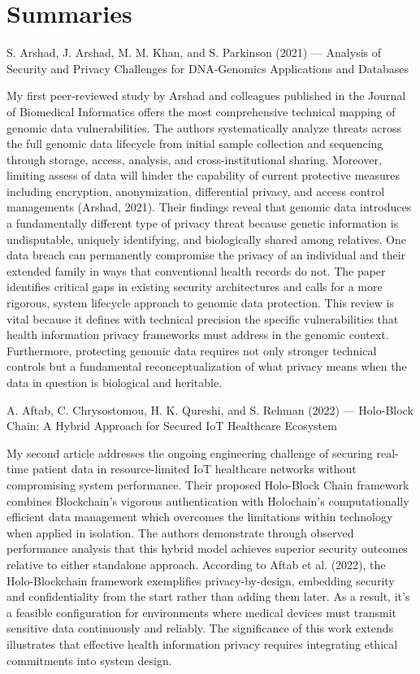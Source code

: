 \documentclass[12pt]{article}
\begin{document}
\section{Summaries}
S. Arshad, J. Arshad, M. M. Khan, and S. Parkinson (2021) — Analysis of Security and Privacy Challenges for DNA-Genomics Applications and Databases

My first peer-reviewed study by Arshad and colleagues published in the Journal of Biomedical Informatics offers the most comprehensive technical mapping of genomic data vulnerabilities. The authors systematically analyze threats across the full genomic data lifecycle from initial sample collection and sequencing through storage, access, analysis, and cross-institutional sharing. Moreover, limiting assess of data will hinder the capability of current protective measures including encryption, anonymization, differential privacy, and access control managements (Arshad, 2021). Their findings reveal that genomic data introduces a fundamentally different type of privacy threat because genetic information is undisputable, uniquely identifying, and biologically shared among relatives. One data breach can permanently compromise the privacy of an individual and their extended family in ways that conventional health records do not. The paper identifies critical gaps in existing security architectures and calls for a more rigorous, system lifecycle approach to genomic data protection. This review is vital because it defines with technical precision the specific vulnerabilities that health information privacy frameworks must address in the genomic context. Furthermore, protecting genomic data requires not only stronger technical controls but a fundamental reconceptualization of what privacy means when the data in question is biological and heritable.

A.	Aftab, C. Chrysostomou, H. K. Qureshi, and S. Rehman  (2022) — Holo-Block Chain: A Hybrid Approach for Secured IoT Healthcare Ecosystem

My second article addresses the ongoing engineering challenge of securing real-time patient data in resource-limited IoT healthcare networks without compromising system performance. Their proposed Holo-Block Chain framework combines Blockchain's vigorous authentication with Holochain's computationally efficient data management which overcomes the limitations within technology when applied in isolation. The authors demonstrate through observed performance analysis that this hybrid model achieves superior security outcomes relative to either standalone approach. According to Aftab et al. (2022), the Holo-Blockchain framework exemplifies privacy-by-design, embedding security and confidentiality from the start rather than adding them later. As a result, it’s a feasible configuration for environments where medical devices must transmit sensitive data continuously and reliably. The significance of this work extends illustrates that effective health information privacy requires integrating ethical commitments into system design. 
\end{document}
